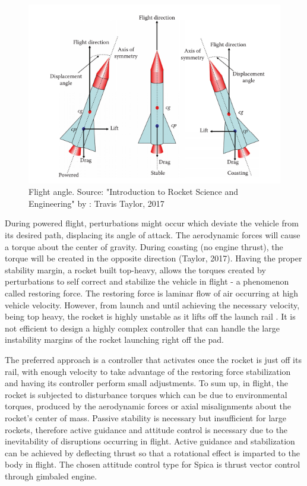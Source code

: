 \begin{figure}[h!]
  \centering
  \includegraphics[scale=0.8]{graphics/flightAngle.png}
  \caption{Flight angle. Source: "Introduction to Rocket Science and Engineering" by : Travis Taylor, 2017}
  \label{forces}
\end{figure}

During powered flight, perturbations might occur which deviate the vehicle from its desired path, displacing its angle of attack. The aerodynamic forces will cause a torque about the center of gravity. During coasting (no engine thrust), the torque will be created in the opposite direction (Taylor, 2017). Having the proper stability margin, a rocket built top-heavy, allows the torques created by perturbations to self correct and stabilize the vehicle in flight - a phenomenon called restoring force. The restoring force is laminar flow of air occurring at high vehicle velocity. However, from launch and until achieving the necessary velocity, being top heavy, the rocket is highly unstable as it lifts off the launch rail \cite{taylor2017introduction}. It is not efficient to design a highly complex controller that can handle the large instability margins of the rocket launching right off the pad. 

The preferred approach is a controller that activates once the rocket is just off its rail, with enough velocity to take advantage of the restoring force stabilization and having its controller perform small adjustments.  To sum up, in flight, the rocket is subjected to disturbance torques which can be due to environmental torques, produced by the aerodynamic forces \cite{wertz2012spacecraft} or axial misalignments about the rocket’s center of mass.  
Passive stability is necessary but insufficient for large rockets, therefore active guidance and attitude control is necessary due to the inevitability of disruptions occurring in flight.
Active guidance and stabilization can be achieved by deflecting thrust so that a rotational effect is imparted to the body in flight. The chosen attitude control type  for Spica is thrust vector control through gimbaled engine. 

